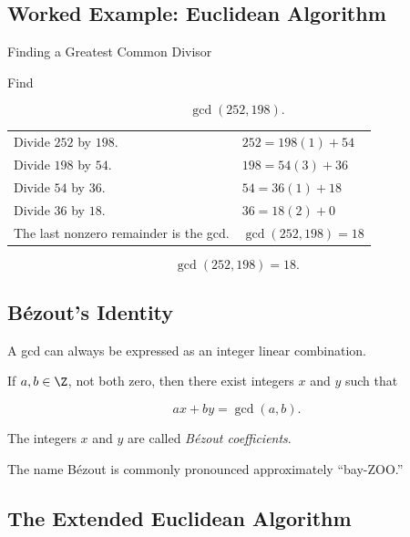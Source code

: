 \subsection{Worked Example: Euclidean Algorithm}
\label{subsec:worked-euclidean-algorithm}

\begin{workedexamplebox}{Finding a Greatest Common Divisor}

Find

\[ \gcd(252,198). \]

\begin{tabularx}{\textwidth}{@{}>{\raggedright\arraybackslash}p{}X@{}}
Divide \(252\) by \(198\). &
\(252=198(1)+54\)\\
Divide \(198\) by \(54\). &
\(198=54(3)+36\)\\
Divide \(54\) by \(36\). &
\(54=36(1)+18\)\\
Divide \(36\) by \(18\). &
\(36=18(2)+0\)\\
The last nonzero remainder is the gcd. &
\(\gcd(252,198)=18\)
\end{tabularx}

\begin{answerbox}
\[ \boxed{\gcd(252,198)=18.} \]
\end{answerbox}
\end{workedexamplebox}

\subsection{Bézout's Identity}
\label{subsec:bezout-identity}

A gcd can always be expressed as an integer linear combination.

\begin{theorem}
If \(a,b\in\Z\), not both zero, then there exist integers \(x\) and \(y\)
such that

\[ ax+by=\gcd(a,b). \]
\end{theorem}

The integers \(x\) and \(y\) are called \emph{Bézout coefficients}.

The name Bézout is commonly pronounced approximately ``bay-ZOO.''

\subsection{The Extended Euclidean Algorithm}
\label{subsec:extended-euclidean-algorithm}

